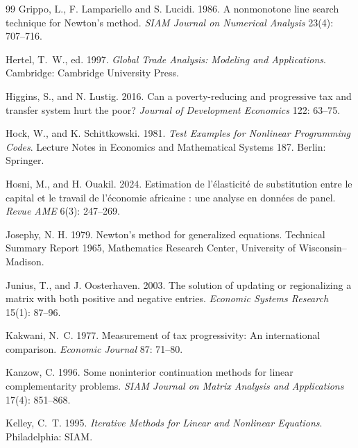 \begin{thebibliography}{99}
Grippo, L., F. Lampariello and S. Lucidi. 1986.
\newblock A nonmonotone line search technique for Newton's method.
\newblock \emph{SIAM Journal on Numerical Analysis} 23(4): 707--716.

Hertel, T.~W., ed. 1997.
\newblock \emph{Global Trade Analysis: Modeling and Applications}.
\newblock Cambridge: Cambridge University Press.

Higgins, S., and N. Lustig. 2016.
\newblock Can a poverty-reducing and progressive tax and transfer system hurt
  the poor?
\newblock \emph{Journal of Development Economics} 122: 63--75.

Hock, W., and K. Schittkowski. 1981.
\newblock \emph{Test Examples for Nonlinear Programming Codes}.
\newblock Lecture Notes in Economics and Mathematical Systems 187. Berlin:
  Springer.

Hosni, M., and H. Ouakil. 2024.
\newblock Estimation de l'\'elasticit\'e de substitution entre le capital et
  le travail de l'\'economie africaine : une analyse en donn\'ees de panel.
\newblock \emph{Revue AME} 6(3): 247--269.

Josephy, N. H. 1979.
\newblock Newton's method for generalized equations.
\newblock Technical Summary Report 1965, Mathematics Research Center,
  University of Wisconsin--Madison.

Junius, T., and J. Oosterhaven. 2003.
\newblock The solution of updating or regionalizing a matrix with both
  positive and negative entries.
\newblock \emph{Economic Systems Research} 15(1): 87--96.

Kakwani, N.~C. 1977.
\newblock Measurement of tax progressivity: An international comparison.
\newblock \emph{Economic Journal} 87: 71--80.

Kanzow, C. 1996.
\newblock Some noninterior continuation methods for linear complementarity
  problems.
\newblock \emph{SIAM Journal on Matrix Analysis and Applications} 17(4):
  851--868.

Kelley, C.~T. 1995.
\newblock \emph{Iterative Methods for Linear and Nonlinear Equations}.
\newblock Philadelphia: SIAM.


\end{thebibliography}
